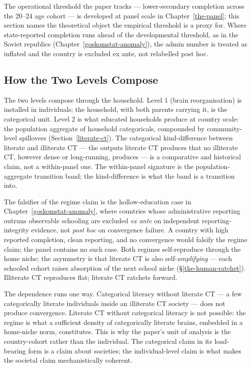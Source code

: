 \documentclass[12pt,letterpaper]{article}
\begin{document}
The operational threshold the paper tracks ---
lower-secondary completion across the 20--24 age cohort --- is
developed at panel scale in Chapter~\ref{the-panel}; this section
names the theoretical object the empirical threshold is a proxy for.
Where state-reported completion runs ahead of the developmental
threshold, as in the
Soviet republics (Chapter~\ref{goskomstat-anomaly}), the admin number
is treated as inflated and the country is excluded ex ante, not
relabelled post hoc.

\subsection{How the Two Levels Compose}\label{levels-compose}

The two levels compose through the household. Level 1 (brain
reorganisation) is installed in individuals; the household, with
both parents carrying it, is the categorical unit. Level 2 is what
educated households produce at country scale: the population
aggregate of household categoricals, compounded by community-level
spillovers (Section~\ref{literate-ct}). The
categorical kind-difference between literate and illiterate CT ---
the outputs literate CT produces that no illiterate CT, however
dense or long-running, produces --- is a comparative and historical
claim, not a within-panel one. The within-panel signature is the
population-aggregate transition band; the kind-difference is what
the band is a transition into.

The falsifier of the regime claim is
the hollow-education case in Chapter~\ref{goskomstat-anomaly},
where countries whose administrative reporting outruns observable
schooling are excluded \emph{ex ante} on independent
reporting-integrity evidence, not \emph{post hoc} on convergence
failure. A country with high reported completion, clean reporting,
and no convergence would falsify the regime claim; the
panel contains no such case. Both regimes self-reproduce through the
home niche; the asymmetry is that literate CT is also
self-\emph{amplifying} --- each schooled cohort raises absorption of
the next school niche (\S\ref{the-human-ratchet}). Illiterate CT
reproduces flat; literate CT ratchets forward.

The dependence runs one way. Categorical literacy without
literate CT --- a few categorically literate individuals inside an
illiterate CT society --- does not produce convergence. Literate
CT without categorical literacy is not possible:
the regime is what a sufficient density of categorically literate
brains, embedded in a home-niche norm, constitutes. This is why the
paper's unit of analysis is the country-cohort rather than the
individual. The categorical claim in its load-bearing form is a claim
about societies; the individual-level claim is what makes the
societal claim mechanistically coherent.
\end{document}
